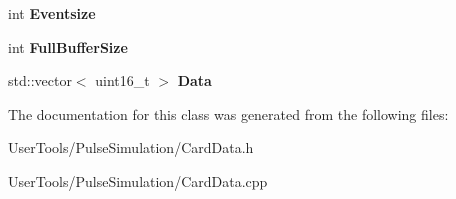 \begin{DoxyCompactItemize}
\item 
\hypertarget{classCardData_abafe428221ab0987ac51bd7312b29d6b}{int {\bfseries Eventsize}}\label{classCardData_abafe428221ab0987ac51bd7312b29d6b}

\item 
\hypertarget{classCardData_a3395d60095ef7aeff93cf2d169a34395}{int {\bfseries Full\-Buffer\-Size}}\label{classCardData_a3395d60095ef7aeff93cf2d169a34395}

\item 
\hypertarget{classCardData_a6190a518c1cc009d169a0f94a333576d}{std\-::vector$<$ uint16\-\_\-t $>$ {\bfseries Data}}\label{classCardData_a6190a518c1cc009d169a0f94a333576d}

\end{DoxyCompactItemize}


The documentation for this class was generated from the following files\-:\begin{DoxyCompactItemize}
\item 
User\-Tools/\-Pulse\-Simulation/Card\-Data.\-h\item 
User\-Tools/\-Pulse\-Simulation/Card\-Data.\-cpp\end{DoxyCompactItemize}
